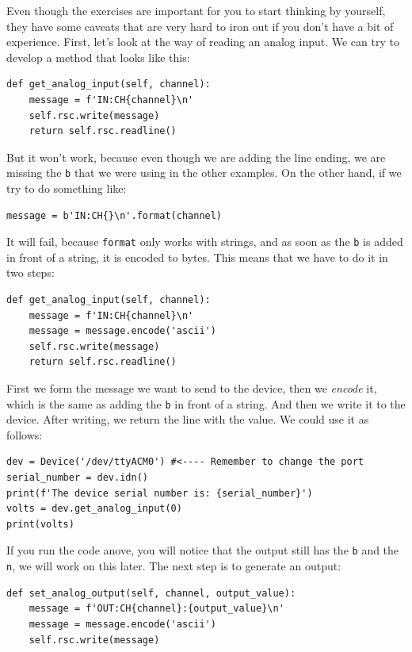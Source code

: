 Even though the exercises are important for you to start thinking by yourself, they have some caveats that are very hard to iron out if you don't have a bit of experience. First, let's look at the way of reading an analog input. We can try to develop a method that looks like this:

\begin{verbatim}
def get_analog_input(self, channel):
    message = f'IN:CH{channel}\n'
    self.rsc.write(message)
    return self.rsc.readline()
\end{verbatim}

But it won't work, because even though we are adding the line ending, we are missing the \texttt{b} that we were using in the other examples. On the other hand, if we try to do something like:

\begin{verbatim}
message = b'IN:CH{}\n'.format(channel)
\end{verbatim}

It will fail, because \texttt{format} only works with strings, and as soon as the \texttt{b} is added in front of a string, it is encoded to bytes. This means that we have to do it in two steps:

\begin{verbatim}
def get_analog_input(self, channel):
    message = f'IN:CH{channel}\n'
    message = message.encode('ascii')
    self.rsc.write(message)
    return self.rsc.readline()
\end{verbatim}

First we form the message we want to send to the device, then we \emph{encode} it, which is the same as adding the \texttt{b} in front of a string. And then we write it to the device. After writing, we return the line with the value. We could use it as follows:

\begin{verbatim}
dev = Device('/dev/ttyACM0') #<---- Remember to change the port
serial_number = dev.idn()
print(f'The device serial number is: {serial_number}')
volts = dev.get_analog_input(0)
print(volts)
\end{verbatim}

If you run the code anove, you will notice that the output still has the \texttt{b} and the \texttt{\\n}, we will work on this later. The next step is to generate an output:

\begin{verbatim}
def set_analog_output(self, channel, output_value):
    message = f'OUT:CH{channel}:{output_value}\n'
    message = message.encode('ascii')
    self.rsc.write(message)
\end{verbatim}

